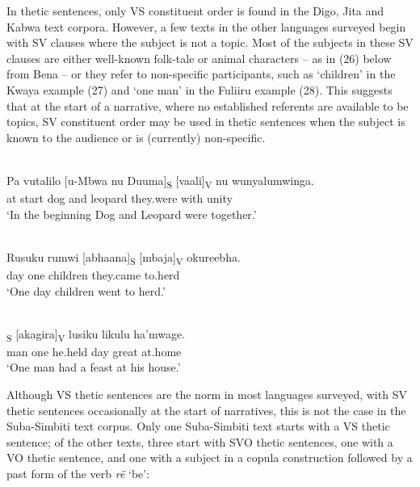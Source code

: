 \documentclass[output=paper]{langsci/langscibook}
\begin{document}
In thetic sentences, only VS constituent order is found in the Digo, Jita and Kabwa text corpora. However, a few texts in the other languages surveyed begin with SV clauses where the subject is not a topic. Most of the subjects in these SV clauses are either well-known folk-tale or animal characters – as in (26) below from Bena – or they refer to non-specific participants, such as ‘children’ in the Kwaya example (27) and ‘one man’ in the Fuliiru example (28). This suggests that at the start of a narrative, where no established referents are available to be topics, SV constituent order may be used in thetic sentences when the subject is known to the audience or is (currently) non-specific.

\ea\label{ex:}
\\

\gll Pa vutalilo [u-Mbwa nu Duuma]\textsubscript{S} [vaali]\textsubscript{V} nu wunyalumwinga.\\
at start dog and leopard they.were with unity\\
\upshape
‘In the beginning Dog and Leopard were together.’
\z

\ea\label{ex:}
\\
\gll Rusuku rumwi [abhaana]\textsubscript{S} [mbaja]\textsubscript{V} okureebha.\\
day one children they.came to.herd\\
\upshape
‘One day children went to herd.’
\z


\ea\label{ex:}
\\
\textsubscript{S} [akagira]\textsubscript{V} lusiku likulu ha’mwage.\\
man one he.held day great at.home\\
\upshape
‘One man had a feast at his house.’
\z

Although VS thetic sentences are the norm in most languages surveyed, with SV thetic sentences occasionally at the start of narratives, this is not the case in the Suba-Simbiti text corpus. Only one Suba-Simbiti text starts with a VS thetic sentence; of the other texts, three start with SVO thetic sentences, one with a VO thetic sentence, and one with a subject in a copula construction followed by a past form of the verb\emph{ rë} ‘be’:


\ea\label{ex:}
\\
\end{document}
